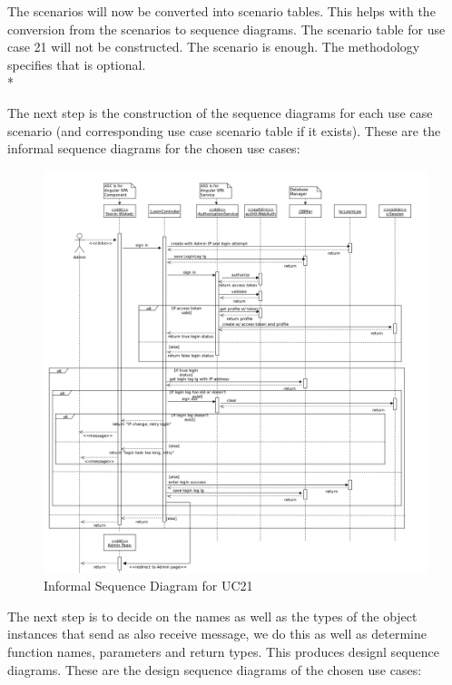 \documentclass[11pt]{article}
\begin{document}
The scenarios will now be converted into scenario tables. This helps with the conversion from the scenarios to sequence diagrams. The scenario table for use case 21 will not be constructed. The scenario is enough. The methodology specifies that is optional. \\*

The next step is the construction of the sequence diagrams for each use case scenario (and corresponding use case scenario table if it exists). These are the informal sequence diagrams for the chosen use cases:

\begin{figure}[H]
	\centering
	\hspace*{-1.5cm}\includegraphics[width=1.2\textwidth]{../../images/Informal_Sequence_Diagram_UC21.png}
	\caption{Informal Sequence Diagram for UC21}
\end{figure}

The next step is to decide on the names as well as the types of the object instances that send as also receive message, we do this as well as determine function names, parameters and return types. This produces designl sequence diagrams. These are the design sequence diagrams of the chosen use cases:
\end{document}
